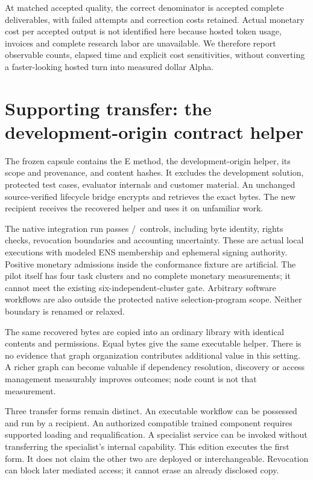 \documentclass[11pt,letterpaper]{article}
\begin{document}
At matched accepted quality, the correct denominator is accepted complete deliverables, with failed attempts and correction costs retained. Actual monetary cost per accepted output is not identified here because hosted token usage, invoices and complete research labor are unavailable. We therefore report observable counts, elapsed time and explicit cost sensitivities, without converting a faster-looking hosted turn into measured dollar Alpha.

\section{Supporting transfer: the development-origin contract helper}
The frozen capsule contains the E method, the development-origin helper, its scope and provenance, and content hashes. It excludes the development solution, protected test cases, evaluator internals and customer material. An unchanged source-verified lifecycle bridge encrypts and retrieves the exact bytes. The new recipient receives the recovered helper and uses it on unfamiliar work.

The native integration run passes \NativePassed/\NativeTotal\ controls, including byte identity, rights checks, revocation boundaries and accounting uncertainty. These are actual local executions with modeled ENS membership and ephemeral signing authority. Positive monetary admissions inside the conformance fixture are artificial. The pilot itself has four task clusters and no complete monetary measurements; it cannot meet the existing six-independent-cluster gate. Arbitrary software workflows are also outside the protected native selection-program scope. Neither boundary is renamed or relaxed.

The same recovered bytes are copied into an ordinary library with identical contents and permissions. Equal bytes give the same executable helper. There is no evidence that graph organization contributes additional value in this setting. A richer graph can become valuable if dependency resolution, discovery or access management measurably improves outcomes; node count is not that measurement.

Three transfer forms remain distinct. An executable workflow can be possessed and run by a recipient. An authorized compatible trained component requires supported loading and requalification. A specialist service can be invoked without transferring the specialist's internal capability. This edition executes the first form. It does not claim the other two are deployed or interchangeable. Revocation can block later mediated access; it cannot erase an already disclosed copy.
\end{document}
